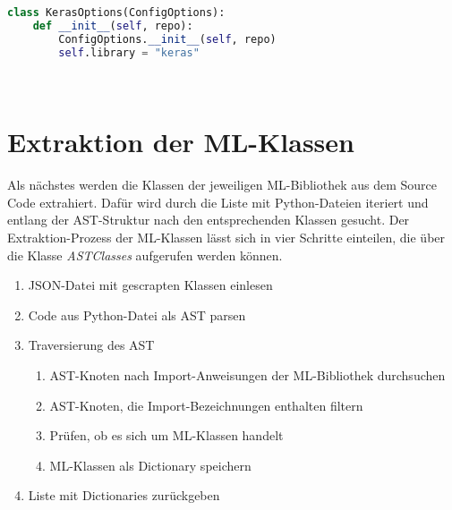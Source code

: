 \documentclass[german,bachelor]{swsLeipzig}
\begin{document}
\begin{lstlisting}[language=Python, frame=single, basicstyle=\small]
class KerasOptions(ConfigOptions):
    def __init__(self, repo):
        ConfigOptions.__init__(self, repo)
        self.library = "keras"
\end{lstlisting}
\


\section{Extraktion der ML-Klassen}\label{Classes}
Als nächstes werden die Klassen der jeweiligen ML-Bibliothek aus dem Source Code extrahiert.
Dafür wird durch die Liste mit Python-Dateien iteriert und entlang der AST-Struktur nach den entsprechenden Klassen gesucht.
Der Extraktion-Prozess der ML-Klassen lässt sich in vier Schritte einteilen, die über die Klasse
\textit{ASTClasses} aufgerufen werden können.

\begin{enumerate}
 \item JSON-Datei mit gescrapten Klassen einlesen
 \item Code aus Python-Datei als AST parsen
 \item Traversierung des AST
\begin{enumerate}
    \item AST-Knoten nach Import-Anweisungen der ML-Bibliothek durchsuchen
    \item AST-Knoten, die Import-Bezeichnungen enthalten filtern
    \item Prüfen, ob es sich um ML-Klassen handelt
    \item ML-Klassen als Dictionary speichern
    \end{enumerate}
 \item Liste mit Dictionaries zurückgeben
\end{enumerate}
\end{document}
